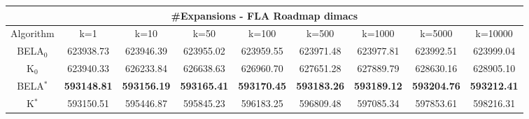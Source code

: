 \begin{tabular}{c|cccccccc}\toprule
\multicolumn{9}{c}{#Expansions - FLA Roadmap dimacs}\\ \midrule
Algorithm & k=1 & k=10 & k=50 & k=100 & k=500 & k=1000 & k=5000 & k=10000 \\ \midrule
BELA$_0$ & 623938.73 & 623946.39 & 623955.02 & 623959.55 & 623971.48 & 623977.81 & 623992.51 & 623999.04 \\
K$_0$ & 623940.33 & 626233.84 & 626638.63 & 626960.70 & 627651.28 & 627889.79 & 628630.16 & 628905.10 \\
BELA$^*$ & \textbf{593148.81} & \textbf{593156.19} & \textbf{593165.41} & \textbf{593170.45} & \textbf{593183.26} & \textbf{593189.12} & \textbf{593204.76} & \textbf{593212.41} \\
K$^*$ & 593150.51 & 595446.87 & 595845.23 & 596183.25 & 596809.48 & 597085.34 & 597853.61 & 598216.31 \\ \bottomrule 
\end{tabular}
